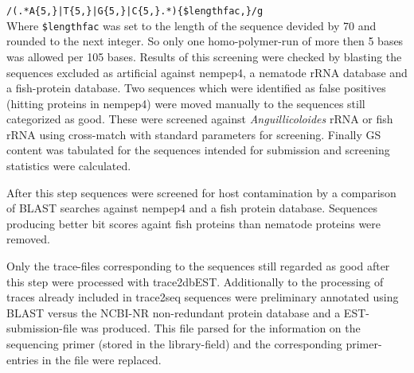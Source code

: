 \texttt{/(.*A\{5,\}|T\{5,\}|G\{5,\}|C\{5,\}.*)\{\$lengthfac,\}/g}\\

Where \texttt{\$lengthfac} was set to the length of the sequence
devided by 70 and rounded to the next integer. So only one
homo-polymer-run of more then 5 bases was allowed per 105 bases.
Results of this screening were checked by blasting the sequences
excluded as artificial against nempep4, a nematode rRNA database and a
fish-protein database. Two sequences which were identified as false
positives (hitting proteins in nempep4) were moved manually to the
sequences still categorized as good. These were screened against
\textit{Anguillicoloides} rRNA or fish rRNA using
cross-match\cite{PHRAP} with standard parameters for screening.
Finally GS content was tabulated for the sequences intended for
submission and screening statistics were calculated.

After this step sequences were screened for host contamination by a
comparison of BLAST searches against nempep4 and a fish protein
database. Sequences producing better bit scores againt fish proteins
than nematode proteins were removed.

Only the trace-files corresponding to the sequences still regarded as
good after this step were processed with trace2dbEST. Additionally to
the processing of traces already included in trace2seq sequences were
preliminary annotated using BLAST versus the NCBI-NR non-redundant
protein database and a EST-submission-file was produced. This file
parsed for the information on the sequencing primer (stored in the
library-field) and the corresponding primer-entries in the file were
replaced.



 




 






